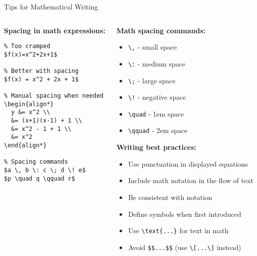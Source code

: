      \begin{frame}[fragile]{Tips for Mathematical Writing}
          \begin{columns}
               \begin{column}{0.5\textwidth}
                    \textbf{Spacing in math expressions:}
                    
                    \begin{lstlisting}
% Too cramped
$f(x)=x^2+2x+1$

% Better with spacing
$f(x) = x^2 + 2x + 1$

% Manual spacing when needed
\begin{align*}
  y &= x^2 \\
  &= (x+1)(x-1) + 1 \\
  &= x^2 - 1 + 1 \\
  &= x^2
\end{align*}

% Spacing commands
$a \, b \: c \; d \! e$
$p \quad q \qquad r$
                    \end{lstlisting}
               \end{column}
               
               \begin{column}{0.5\textwidth}
                    \textbf{Math spacing commands:}
                    \begin{itemize}
                         \item \texttt{\textbackslash,} - small space
                         \item \texttt{\textbackslash:} - medium space
                         \item \texttt{\textbackslash;} - large space
                         \item \texttt{\textbackslash!} - negative space
                         \item \texttt{\textbackslash quad} - 1em space
                         \item \texttt{\textbackslash qquad} - 2em space
                    \end{itemize}
                    
                    \textbf{Writing best practices:}
                    \begin{itemize}
                         \item Use punctuation in displayed equations
                         \item Include math notation in the flow of text
                         \item Be consistent with notation
                         \item Define symbols when first introduced
                         \item Use \texttt{\textbackslash text\{...\}} for text in math
                         \item Avoid \texttt{\$\$...\$\$} (use \texttt{\textbackslash[...\textbackslash]} instead)
                    \end{itemize}
               \end{column}
          \end{columns}
     \end{frame}
